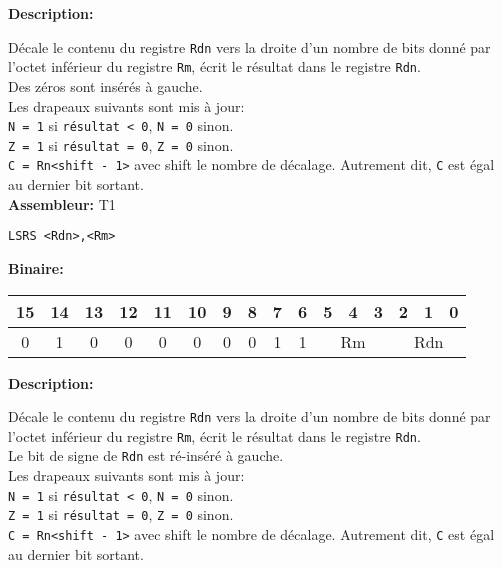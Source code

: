 
\textbf{Description: }

Décale le contenu du registre \texttt{Rdn} vers la droite d'un nombre de bits donné par l'octet inférieur du registre \texttt{Rm}, écrit le résultat dans le registre \texttt{Rdn}.\\
Des zéros sont insérés à gauche.\\
Les drapeaux suivants sont mis à jour:\\
\texttt{N = 1} si \texttt{résultat < 0}, \texttt{N = 0} sinon.\\
\texttt{Z = 1} si \texttt{résultat = 0}, \texttt{Z = 0} sinon.\\
\texttt{C = Rn<shift - 1>} avec shift le nombre de décalage. Autrement dit, \texttt{C} est égal au dernier bit sortant.\\

\textbf{Assembleur:} T1

\begin{lstlisting}
LSRS <Rdn>,<Rm>
\end{lstlisting}

\textbf{Binaire:}\\

\begin{tabular}{| c c c c c c c c c c c c c c c c |}
\hline
15 & 14 & 13 & 12 & 11 & 10 & \multicolumn{1}{|c}{9} & 8 & 7 & 6 & \multicolumn{1}{|c}{5} & 4 & 3 & \multicolumn{1}{|c}{2} & 1 & 0 \\
\hline
0 & 1 & 0 & 0 & 0 & 0 & \multicolumn{1}{|c}{0} & 0 & 1 & 1 & \multicolumn{3}{|c}{Rm} & \multicolumn{3}{|c|}{Rdn} \\
\hline
\end{tabular}



\textbf{Description: }

Décale le contenu du registre \texttt{Rdn} vers la droite d'un nombre de bits donné par l'octet inférieur du registre \texttt{Rm}, écrit le résultat dans le registre \texttt{Rdn}.\\
Le bit de signe de \texttt{Rdn} est ré-inséré à gauche.\\
Les drapeaux suivants sont mis à jour:\\
\texttt{N = 1} si \texttt{résultat < 0}, \texttt{N = 0} sinon.\\
\texttt{Z = 1} si \texttt{résultat = 0}, \texttt{Z = 0} sinon.\\
\texttt{C = Rn<shift - 1>} avec shift le nombre de décalage. Autrement dit, \texttt{C} est égal au dernier bit sortant.\\


